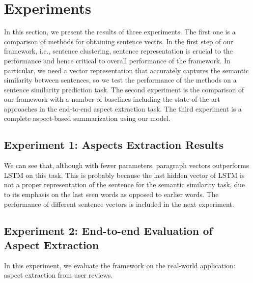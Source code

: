 \section{Experiments}
\label{sec:experiments}




In this section, we present the results of three experiments. 
The first one is a comparison of methods for obtaining sentence vectrs. 
In the first step of our framework, i.e., sentence clustering, 
sentence representation is crucial to the performance 
and hence critical to overall performance of the framework. 
In particular, we need a vector representation 
that accurately captures the semantic similarity between sentences, 
so we test the performance of the methods on a sentence similarity 
prediction task. 
The second experiment is the comparison of our framework
with a number of baselines including the state-of-the-art approaches
in the end-to-end aspect extraction task.
The third experiment is a complete aspect-based summarization using our model.

\subsection{Experiment 1: Aspects Extraction Results}


We can see that, although with fewer parameters, 
paragraph vectors outperforms LSTM on this task. 
This is probably because the last hidden vector of LSTM is not 
a proper representation of the sentence for the semantic similarity task, 
due to its emphasis on the last seen words as opposed to earlier words. 
The performance of different sentence vectors is included in the next experiment.


\subsection{Experiment 2: End-to-end Evaluation of Aspect Extraction}

In this experiment, we evaluate the framework on the real-world application:
aspect extraction from user reviews. 

